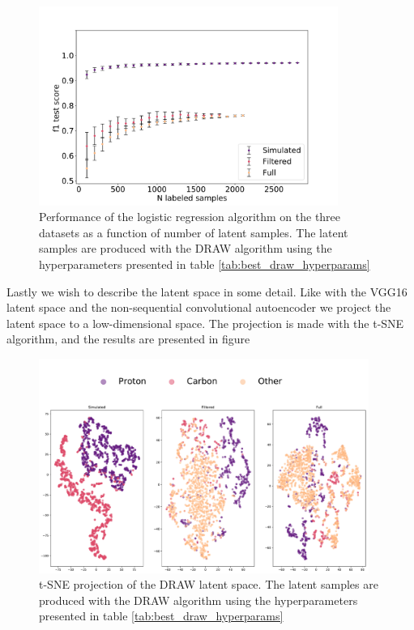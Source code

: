 \begin{figure}
\includegraphics[width=\textwidth, height=6.5cm]{plots/ac_draw_n_samples.pdf}
\caption[Semi supervised classification with DRAW]{Performance of the logistic regression algorithm on the three datasets as a function of number of latent samples. The latent samples are produced with the DRAW algorithm using the hyperparameters presented in table \ref{tab:best_draw_hyperparams}}\label{fig:draw_nsamples}
\end{figure}


Lastly we wish to describe the latent space in some detail. Like with the VGG16 latent space and the non-sequential convolutional autoencoder we project the latent space to a low-dimensional space. The projection is made with the t-SNE algorithm, and the results are presented in figure 


\begin{figure}
\includegraphics[width=\textwidth, height=7cm]{plots/ac_tsne_draw.pdf}
\caption[t-SNE projection of the DRAW latent space]{t-SNE projection of the DRAW latent space.  The latent samples are produced with the DRAW algorithm using the hyperparameters presented in table \ref{tab:best_draw_hyperparams}}
\end{figure}
